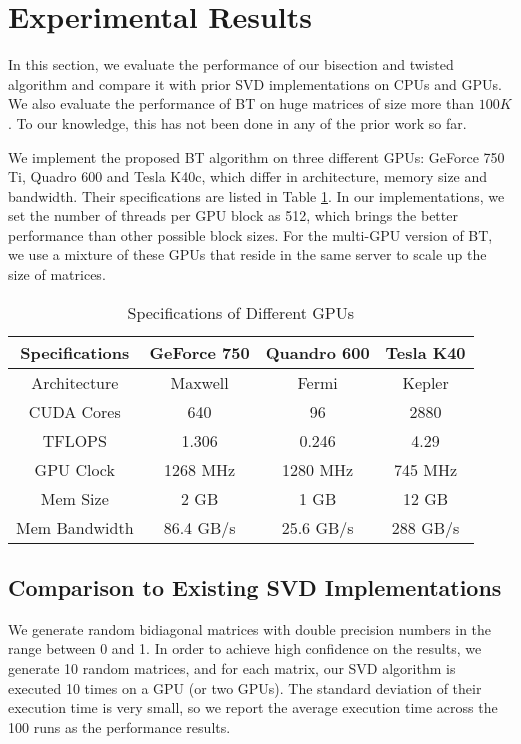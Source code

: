 \section{Experimental Results}
\label{sec:results}
In this section, we evaluate the performance of our bisection and twisted algorithm and compare it with prior SVD implementations on CPUs and GPUs.
We also evaluate the performance of BT on huge matrices of size more than $100K$. 
To our knowledge, this has not been done in any of the prior work so far. 

We implement the proposed BT algorithm on three different GPUs: GeForce 750 Ti, Quadro 600 and Tesla K40c,
which differ in architecture, memory size and bandwidth.
Their specifications are listed in Table \ref{tab:spec}. 
In our implementations, we set the number of threads per GPU block as 512, which brings the better performance than other possible block sizes.
For the multi-GPU version of BT, we use a mixture of these GPUs that reside in the same server to scale up the size of matrices. 
\begin{table}[h]
\caption{Specifications of Different GPUs}
\centering
\begin{tabular}{|c|c|c|c|}
\hline
Specifications & GeForce 750 & Quandro 600 & Tesla K40 \\ \hline
Architecture   &     Maxwell &       Fermi &    Kepler \\ \hline
CUDA Cores     &         640 &          96 &      2880 \\ \hline
TFLOPS         &       1.306 &       0.246 &      4.29 \\ \hline
GPU Clock      &    1268 MHz &    1280 MHz &   745 MHz \\ \hline
Mem Size       &        2 GB &        1 GB &     12 GB \\ \hline
Mem Bandwidth  &   86.4 GB/s &   25.6 GB/s &  288 GB/s \\ \hline
\end{tabular}
\label{tab:spec}
\vspace{-0.1in}
\end{table}

\subsection{Comparison to Existing SVD Implementations}
We generate random bidiagonal matrices with double precision numbers in the range between 0 and 1.
In order to achieve high confidence on the results, we generate 10 random matrices, and for each matrix, our SVD algorithm is executed 10 times on a GPU (or two GPUs).
The standard deviation of their execution time is very small, so we report the average execution time across the 100 runs as the performance results.

